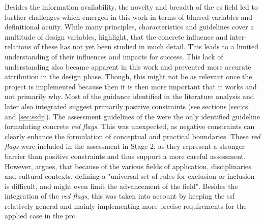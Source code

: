 Besides the information availability, the novelty and breadth of the \acrshort{cs} field led to further challenges which emerged in this work in terms of blurred variables and definitional acuity. While many principles, characteristics and guidelines cover a multitude of design variables, \autocite{kirschkeCitizenScienceProjects2022} highlight, that the concrete influence and inter-relations of these has not yet been studied in much detail. This leads to a limited understanding of their influences and impacts for success. This lack of understanding also became apparent in this work and prevented more accurate attribution in the design phase. Though, this might not be as relevant once the project is implemented because then it is then more important that it works and not primarily why.\newline
Most of the guidance identified in the literature analysis and later also integrated suggest primarily positive constraints (see sections \ref{sec:cs} and \ref{sec:ssdr}). The assessment guidelines of the \autocite{ifrcCommunityBasedSurveillanceGuiding2017} were the only identified guideline formulating concrete \textit{red flags}. This was unexpected, as negative constraints can clearly enhance the formulation of conceptual and practical boundaries. These \textit{red flags} were included in the assessment in Stage 2, as they represent a stronger barrier than positive constraints and thus support a more careful assessment. However, \autocite[1]{escaECSACharacteristicsCitizen2020} argues, that because of the various fields of application, disciplinaries and cultural contexts, defining a "universal set of rules for exclusion or inclusion is difficult, and might even limit the advancement of the field". Besides the integration of the \textit{red flags}, this was taken into account by keeping the \acrshort{ssf} relatively general and mainly implementing more precise requirements for the applied case in the \acrshort{prc}.

